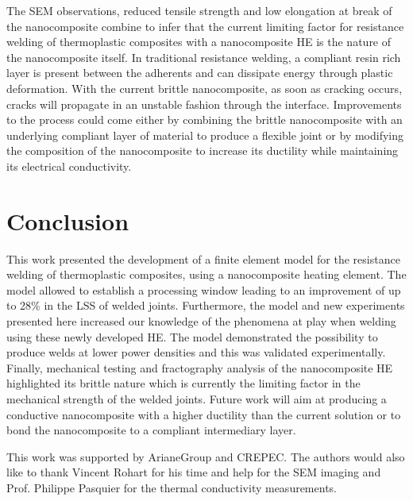 \documentclass[review,times,sagev,doublespace]{sagej}
\begin{document}
The SEM observations, reduced tensile strength and low elongation at break of the nanocomposite combine to infer that the current limiting factor for resistance welding of thermoplastic composites with a nanocomposite HE is the nature of the nanocomposite itself. 
In traditional resistance welding, a compliant resin rich layer is present between the adherents and can dissipate energy through plastic deformation. 
With the current brittle nanocomposite, as soon as cracking occurs, cracks will propagate in an unstable fashion through the interface. 
Improvements to the process could come either by combining the brittle nanocomposite with an underlying compliant layer of material to produce a flexible joint or by modifying the composition of the nanocomposite to increase its ductility while maintaining its electrical conductivity. 

\section{Conclusion}

This work presented the development of a finite element model for the resistance welding of thermoplastic composites, using a nanocomposite heating element. 
The model allowed to establish a processing window leading to an improvement of up to 28\% in the LSS of welded joints. 
Furthermore, the model and new experiments presented here increased our knowledge of the phenomena at play when welding using these newly developed HE. 
The model demonstrated the possibility to produce welds at lower power densities and this was validated experimentally. 
Finally, mechanical testing and fractography analysis of the nanocomposite HE highlighted its brittle nature which is currently the limiting factor in the mechanical strength of the welded joints. 
Future work will aim at producing a conductive nanocomposite with a higher ductility than the current solution or to bond the nanocomposite to a compliant intermediary layer. 

\begin{acks}

This work was supported by ArianeGroup and CREPEC. 
The authors would also like to thank Vincent Rohart for his time and help for the SEM imaging and Prof. Philippe Pasquier for the thermal conductivity measurements. 

\end{acks}
\end{document}
